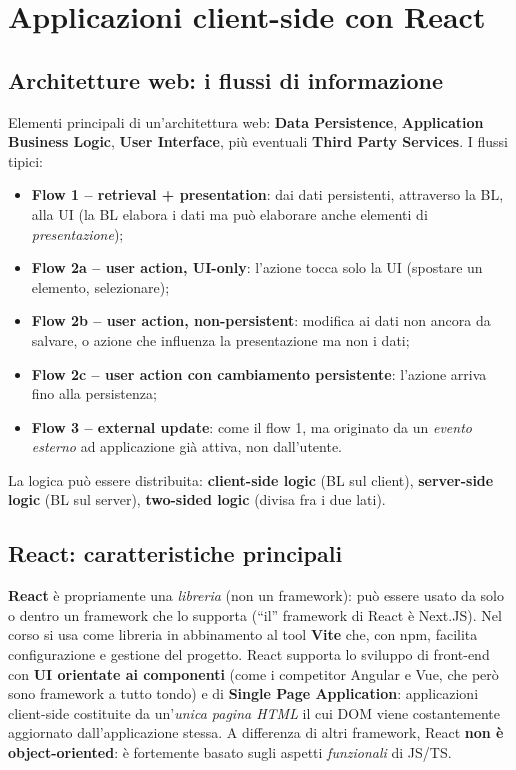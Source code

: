 \chapter{Applicazioni client-side con React}

\section{Architetture web: i flussi di informazione}

Elementi principali di un'architettura web: \textbf{Data Persistence},
\textbf{Application Business Logic}, \textbf{User Interface}, pi\`u eventuali
\textbf{Third Party Services}. I flussi tipici:
\begin{itemize}
  \item \textbf{Flow 1 -- retrieval + presentation}: dai dati persistenti, attraverso la BL,
        alla UI (la BL elabora i dati ma pu\`o elaborare anche elementi di
        \emph{presentazione});
  \item \textbf{Flow 2a -- user action, UI-only}: l'azione tocca solo la UI (spostare un
        elemento, selezionare);
  \item \textbf{Flow 2b -- user action, non-persistent}: modifica ai dati non ancora da
        salvare, o azione che influenza la presentazione ma non i dati;
  \item \textbf{Flow 2c -- user action con cambiamento persistente}: l'azione arriva fino
        alla persistenza;
  \item \textbf{Flow 3 -- external update}: come il flow 1, ma originato da un \emph{evento
        esterno} ad applicazione gi\`a attiva, non dall'utente.
\end{itemize}
La logica pu\`o essere distribuita: \textbf{client-side logic} (BL sul client),
\textbf{server-side logic} (BL sul server), \textbf{two-sided logic} (divisa fra i due lati).

\section{React: caratteristiche principali}

\begin{definizione}[React]
\textbf{React} \`e propriamente una \emph{libreria} (non un framework): pu\`o essere usato da
solo o dentro un framework che lo supporta (``il'' framework di React \`e Next.JS). Nel corso
si usa come libreria in abbinamento al tool \textbf{Vite} che, con npm, facilita
configurazione e gestione del progetto. React supporta lo sviluppo di front-end con
\textbf{UI orientate ai componenti} (come i competitor Angular e Vue, che per\`o sono
framework a tutto tondo) e di \textbf{Single Page Application}: applicazioni client-side
costituite da un'\emph{unica pagina HTML} il cui DOM viene costantemente aggiornato
dall'applicazione stessa. A differenza di altri framework, React \textbf{non \`e
object-oriented}: \`e fortemente basato sugli aspetti \emph{funzionali} di JS/TS.
\end{definizione}

